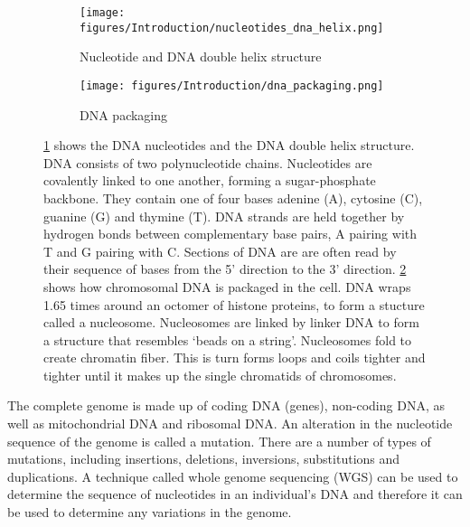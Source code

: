 \begin{figure}[htb]
\begin{subfigure}[t]{0.5\textwidth}
    \texttt{[image: figures/Introduction/nucleotides\_dna\_helix.png]}
    \caption{Nucleotide and DNA double helix structure}
    \label{fig:base_pairs}
\end{subfigure}
\begin{subfigure}[t]{0.5\textwidth}
    \texttt{[image: figures/Introduction/dna\_packaging.png]}
    \caption{DNA packaging}
    \label{fig:DNA_packaging}
\end{subfigure}
    \caption[DNA stucture and packaging.]{\ref{fig:base_pairs} shows the DNA nucleotides and the DNA double helix structure.
    DNA consists of two polynucleotide chains.
    Nucleotides are covalently linked to one another, forming a sugar-phosphate backbone.
    They contain one of four bases adenine (A), cytosine (C), guanine (G) and thymine (T).
    DNA strands are held together by hydrogen bonds between complementary base pairs, A pairing with T and G pairing with C\@.
    Sections of DNA are are often read by their sequence of bases from the 5' direction to the 3' direction.
    \ref{fig:DNA_packaging} shows how chromosomal DNA is packaged in the cell.
    DNA wraps 1.65 times around an octomer of histone proteins, to form a stucture called a nucleosome.
    Nucleosomes are linked by linker DNA to form a structure that resembles `beads on a string'.
    Nucleosomes fold to create chromatin fiber.
    This is turn forms loops and coils tighter and tighter until it makes up the single chromatids of chromosomes.
    }
\label{fig:DNA_structure_packaging}
\end{figure}

The complete genome is made up of coding DNA (genes), non-coding DNA, as well as mitochondrial DNA and ribosomal DNA\@.
An alteration in the nucleotide sequence of the genome is called a mutation.
There are a number of types of mutations, including insertions, deletions, inversions, substitutions and duplications.
A technique called whole genome sequencing (WGS) can be used to determine the sequence of nucleotides in an individual's DNA and therefore it can be used to determine any variations in the genome.


